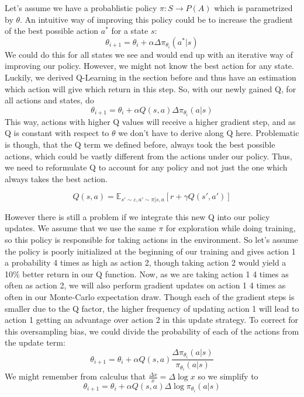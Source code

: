 \documentclass[hyperref,german,beleg]{cgvpub}
\begin{document}
Let's assume we have a probablistic policy $\pi: S \rightarrow P(A)$ which is parametrized by $\theta$. An intuitive way of improving this policy could be to increase the gradient of the best possible action $a^*$ for a state $s$:
\begin{equation}
\theta_{i+1} = \theta_i + \alpha \Delta \pi_{\theta_i}(a^*|s)
\end{equation}
We could do this for all states we see and would end up with an iterative way of improving our policy. However, we might not know the best action for any state. Luckily, we derived Q-Learning in the section before and thus have an estimation which action will give which return in this step. So, with our newly gained Q, for all actions and states, do
\begin{equation}
\theta_{i+1} = \theta_i + \alpha Q(s, a)\Delta \pi_{\theta_i}(a|s)
\end{equation}
This way, actions with higher Q values will receive a higher gradient step, and as Q is constant with respect to $\theta$ we don't have to derive along Q here. Problematic is though, that the Q term we defined before, always took the best possible actions, which could be vastly different from the actions under our policy. Thus, we need to reformulate Q to account for any policy and not just the one which always takes the best action.

\begin{equation}
Q(s, a) = \mathbb{E}_{s' \sim \varepsilon, a' \sim \pi | s,a}[r + \gamma Q(s', a')]
\end{equation}

However there is still a problem if we integrate this new Q into our policy updates. We assume that we use the same $\pi$ for exploration while doing training, so this policy is responsible for taking actions in the environment. So let's assume the policy is poorly initialized at the beginning of our training and gives action 1 a probability 4 times as high as action 2, though taking action 2 would yield a 10\% better return in our Q function. Now, as we are taking action 1 4 times as often as action 2, we will also perform gradient updates on action 1 4 times as often in our Monte-Carlo expectation draw. Though each of the gradient steps is smaller due to the Q factor, the higher frequency of updating action 1 will lead to action 1 getting an advantage over action 2 in this update strategy. To correct for this oversampling bias, we could divide the probability of each of the actions from the update term:
\begin{equation}
\theta_{i+1} = \theta_i + \alpha Q(s, a) \frac{ \Delta \pi_{\theta_i}(a|s)}{\pi_{\theta_i}(a|s)}
\end{equation}
We might remember from calculus that $\frac{\Delta x}{x} = \Delta \log x$ so we simplify to
\begin{equation}
\theta_{i+1} = \theta_i + \alpha Q(s, a) \Delta \log \pi_{\theta_i}(a|s)
\end{equation}
\end{document}
